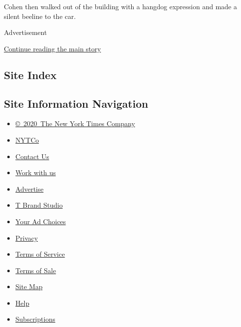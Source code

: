 Cohen then walked out of the building with a hangdog expression and made
a silent beeline to the car.

Advertisement

\protect\hyperlink{after-bottom}{Continue reading the main story}

\hypertarget{site-index}{%
\subsection{Site Index}\label{site-index}}

\hypertarget{site-information-navigation}{%
\subsection{Site Information
Navigation}\label{site-information-navigation}}

\begin{itemize}
\tightlist
\item
  \href{https://help.nytimes.com/hc/en-us/articles/115014792127-Copyright-notice}{©~2020~The
  New York Times Company}
\end{itemize}

\begin{itemize}
\tightlist
\item
  \href{https://www.nytco.com/}{NYTCo}
\item
  \href{https://help.nytimes.com/hc/en-us/articles/115015385887-Contact-Us}{Contact
  Us}
\item
  \href{https://www.nytco.com/careers/}{Work with us}
\item
  \href{https://nytmediakit.com/}{Advertise}
\item
  \href{http://www.tbrandstudio.com/}{T Brand Studio}
\item
  \href{https://www.nytimes.com/privacy/cookie-policy\#how-do-i-manage-trackers}{Your
  Ad Choices}
\item
  \href{https://www.nytimes.com/privacy}{Privacy}
\item
  \href{https://help.nytimes.com/hc/en-us/articles/115014893428-Terms-of-service}{Terms
  of Service}
\item
  \href{https://help.nytimes.com/hc/en-us/articles/115014893968-Terms-of-sale}{Terms
  of Sale}
\item
  \href{https://spiderbites.nytimes.com}{Site Map}
\item
  \href{https://help.nytimes.com/hc/en-us}{Help}
\item
  \href{https://www.nytimes.com/subscription?campaignId=37WXW}{Subscriptions}
\end{itemize}
